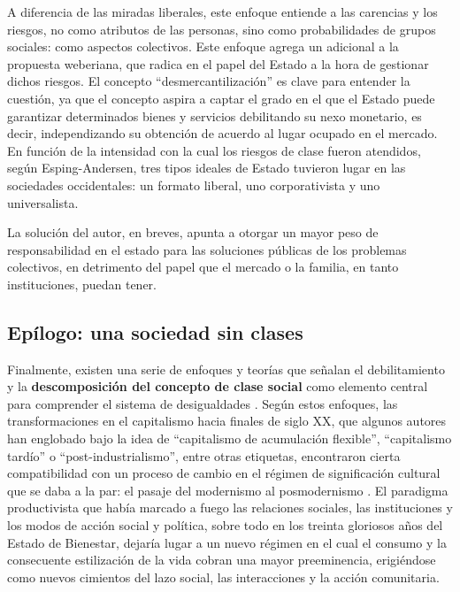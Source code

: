 \documentclass[
]{book}
\begin{document}
A diferencia de las miradas liberales, este enfoque entiende a las carencias y los riesgos, no como atributos de las personas, sino como probabilidades de grupos sociales: como aspectos colectivos. Este enfoque agrega un adicional a la propuesta weberiana, que radica en el papel del Estado a la hora de gestionar dichos riesgos. El concepto ``desmercantilización'' es clave para entender la cuestión, ya que el concepto aspira a captar el grado en el que el Estado puede garantizar determinados bienes y servicios debilitando su nexo monetario, es decir, independizando su obtención de acuerdo al lugar ocupado en el mercado. En función de la intensidad con la cual los riesgos de clase fueron atendidos, según Esping-Andersen, tres tipos ideales de Estado tuvieron lugar en las sociedades occidentales: un formato liberal, uno corporativista y uno universalista.

La solución del autor, en breves, apunta a otorgar un mayor peso de responsabilidad en el estado para las soluciones públicas de los problemas colectivos, en detrimento del papel que el mercado o la familia, en tanto instituciones, puedan tener.

\hypertarget{epuxedlogo-una-sociedad-sin-clases}{%
\subsection{Epílogo: una sociedad sin clases}\label{epuxedlogo-una-sociedad-sin-clases}}

Finalmente, existen una serie de enfoques y teorías que señalan el debilitamiento y la \textbf{descomposición del concepto de clase social} como elemento central para comprender el sistema de desigualdades \citep{Dubet2015}. Según estos enfoques, las transformaciones en el capitalismo hacia finales de siglo XX, que algunos autores han englobado bajo la idea de ``capitalismo de acumulación flexible'', ``capitalismo tardío'' o ``post-industrialismo'', entre otras etiquetas, encontraron cierta compatibilidad con un proceso de cambio en el régimen de significación cultural que se daba a la par: el pasaje del modernismo al posmodernismo \citep{Lash2007}. El paradigma productivista que había marcado a fuego las relaciones sociales, las instituciones y los modos de acción social y política, sobre todo en los treinta gloriosos años del Estado de Bienestar, dejaría lugar a un nuevo régimen en el cual el consumo y la consecuente estilización de la vida cobran una mayor preeminencia, erigiéndose como nuevos cimientos del lazo social, las interacciones y la acción comunitaria.
\end{document}
